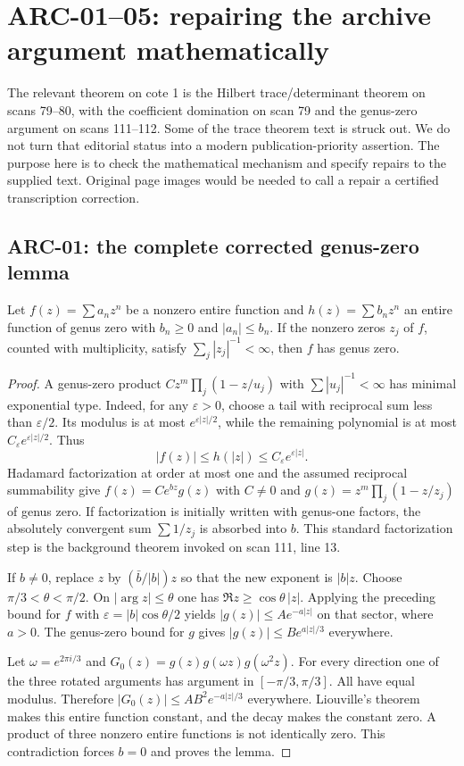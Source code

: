 \section{ARC-01--05: repairing the archive argument mathematically}
The relevant theorem on cote 1 is the Hilbert trace/determinant theorem on scans 79--80, with the coefficient domination on scan 79 and the genus-zero argument on scans 111--112. Some of the trace theorem text is struck out. We do not turn that editorial status into a modern publication-priority assertion. The purpose here is to check the mathematical mechanism and specify repairs to the supplied text. Original page images would be needed to call a repair a certified transcription correction.

\subsection{ARC-01: the complete corrected genus-zero lemma}
\begin{lemma}
Let $f(z)=\sum a_nz^n$ be a nonzero entire function and $h(z)=\sum b_nz^n$ an entire function of genus zero with $b_n\ge0$ and $|a_n|\le b_n$. If the nonzero zeros $z_j$ of $f$, counted with multiplicity, satisfy $\sum_j|z_j|^{-1}<\infty$, then $f$ has genus zero.
\end{lemma}
\begin{proof}
A genus-zero product $Cz^m\prod_j(1-z/u_j)$ with $\sum|u_j|^{-1}<\infty$ has minimal exponential type. Indeed, for any $\varepsilon>0$, choose a tail with reciprocal sum less than $\varepsilon/2$. Its modulus is at most $e^{\varepsilon|z|/2}$, while the remaining polynomial is at most $C_\varepsilon e^{\varepsilon|z|/2}$. Thus
\[
 |f(z)|\le h(|z|)\le C_\varepsilon e^{\varepsilon|z|}.
\]
Hadamard factorization \cite[Theorem 3.16, p.~92]{mcmullen} at order at most one and the assumed reciprocal summability give
$f(z)=Ce^{bz}g(z)$ with $C\ne0$ and $g(z)=z^m\prod_j(1-z/z_j)$ of genus zero. If factorization is initially written with genus-one factors, the absolutely convergent sum $\sum1/z_j$ is absorbed into $b$. This standard factorization step is the background theorem invoked on scan 111, line 13.

If $b\ne0$, replace $z$ by $(\bar b/|b|)z$ so that the new exponent is $|b|z$. Choose $\pi/3<\theta<\pi/2$. On $|\arg z|\le\theta$ one has $\Re z\ge\cos\theta\,|z|$. Applying the preceding bound for $f$ with $\varepsilon=|b|\cos\theta/2$ yields $|g(z)|\le A e^{-a|z|}$ on that sector, where $a>0$. The genus-zero bound for $g$ gives $|g(z)|\le B e^{a|z|/3}$ everywhere.

Let $\omega=e^{2\pi i/3}$ and $G_0(z)=g(z)g(\omega z)g(\omega^2z)$. For every direction one of the three rotated arguments has argument in $[-\pi/3,\pi/3]$. All have equal modulus. Therefore $|G_0(z)|\le AB^2e^{-a|z|/3}$ everywhere. Liouville's theorem \cite[Theorem 1.18, p.~19]{mcmullen} makes this entire function constant, and the decay makes the constant zero. A product of three nonzero entire functions is not identically zero. This contradiction forces $b=0$ and proves the lemma.
\end{proof}

